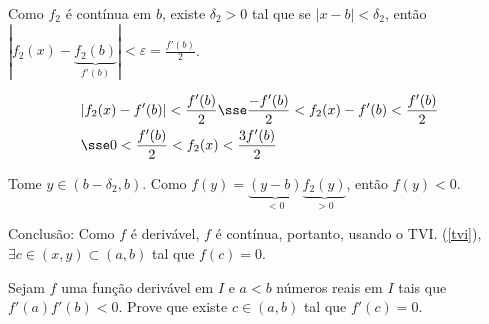 \documentclass[11pt, oneside, a4paper]{gsm-l}
\begin{document}
\begin{sol}
\begin{sloppypar}
Como $f_2$ é contínua em $b$, existe $\delta_2 > 0$ tal que se $|x - b| < \delta_2$, então ${\left| {f_2 (x) - \underbrace {f_2 (b)}_{f'(b)}} \right| < \varepsilon  = \frac{{f'(b)}}{2}}$.
\end{sloppypar}

\[
\begin{gathered}
  |f_2(x) - f'(b)| < \frac{f'(b)}{2} \sse \frac{-f'(b)}{2} < f_2(x) - f'(b) < \frac{f'(b)}{2} \hfill \\
  \sse 0 < \frac{f'(b)}{2} < f_2(x) < \frac{3f'(b)}{2} \hfill \\ 
\end{gathered} 
\]

Tome $y \in (b - \delta_2,b)$. Como $f(y) = \underbrace{(y - b)}_{<0} \underbrace{f_2(y)}_{>0}$, então $f(y) < 0$.

Conclusão: Como $f$ é derivável, $f$ é contínua, portanto, usando o TVI. (\ref{tvi}), $\exists c \in (x,y) \subset (a,b)$ tal que $f(c) = 0$.
\end{sol}

\begin{exer}
Sejam $f$ uma função derivável em $I$ e $a < b$ n\'umeros reais em $I$ tais que $f'(a)f'(b) < 0$. Prove que existe $c \in (a,b)$ tal que $f'(c) = 0$.
\end{exer}
\end{document}
